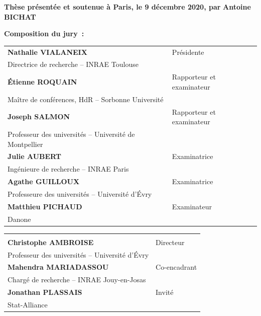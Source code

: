 \documentclass[12pt,a4paper]{reedthesis}
\theoremstyle{definition}
\theoremstyle{definition}
\theoremstyle{definition}
\theoremstyle{remark}
\begin{document}
\begin{titlepage}
\vspace{10mm}

\textbf{Thèse présentée et soutenue à Paris, le 9 décembre 2020, par}
\bigskip
\Large {\color{Prune} \textbf{Antoine BICHAT}}


\vspace{15mm}


\flushleft \normalsize \textbf{Composition du jury~:}
\bigskip


\scriptsize
{}
\begin{tabular}{|p{8cm}l}
\textbf{Nathalie VIALANEIX} &  Présidente\\
Directrice de recherche -- INRAE Toulouse & \\
\textbf{Étienne ROQUAIN} &  Rapporteur et examinateur\\
Maître de conférences, HdR -- Sorbonne Université & \\
\textbf{Joseph SALMON} &  Rapporteur et examinateur\\
Professeur des universités -- Université de Montpellier & \\
\textbf{Julie AUBERT} &  Examinatrice\\
Ingénieure de recherche -- INRAE Paris & \\
\textbf{Agathe GUILLOUX} &  Examinatrice\\
Professeure des universités -- Université d'Évry & \\
\textbf{Matthieu PICHAUD} &  Examinateur\\
Danone & \\
\end{tabular}
\begin{tabular}{p{8cm}l}
& \\
\textbf{Christophe AMBROISE} &  Directeur\\
Professeur des universités -- Université d'Évry & \\
\textbf{Mahendra MARIADASSOU} &  Co-encadrant\\
Chargé de recherche -- INRAE Jouy-en-Josas & \\
\textbf{Jonathan PLASSAIS} &  Invité\\
Stat-Alliance & \\
\end{tabular}
\end{titlepage}
\frontmatter %
\pagestyle{empty} %
\end{document}
